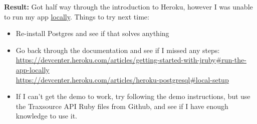 \documentclass{article}
\begin{document}
\textbf{Result:} Got half way through the introduction to Heroku, however I was unable to run my app \hyperlink{https://devcenter.heroku.com/articles/getting-started-with-jruby\#run-the-app-locally}{locally}. Things to try next time:
\begin{itemize}
    \item Re-install Postgres and see if that solves anything
    \item Go back through the documentation and see if I missed any steps:\\
    \url{https://devcenter.heroku.com/articles/getting-started-with-jruby\#run-the-app-locally}\\
    \url{https://devcenter.heroku.com/articles/heroku-postgresql\#local-setup}
    \item If I can't get the demo to work, try following the demo instructions, but use the Traxsource API Ruby files from Github, and see if I have enough knowledge to use it.
\end{itemize}
\end{document}
